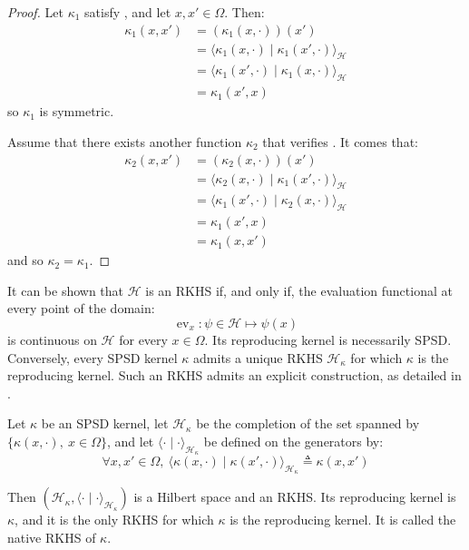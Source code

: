 \begin{proof}
	Let $\kappa_1$ satisfy , and let $x,x'\in\Omega$. Then:
	\begin{equation}
		\begin{aligned}
		\kappa_1(x,x')&=(\kappa_1(x,\cdot))(x')\\
		&=\langle \kappa_1(x,\cdot)\mid \kappa_1(x',\cdot)\rangle_{\mathcal{H}}\\
		&=\langle \kappa_1(x',\cdot)\mid \kappa_1(x,\cdot)\rangle_{\mathcal{H}}\\
		&=\kappa_1(x',x)
		\end{aligned}
	\end{equation}
	so $\kappa_1$ is symmetric.

	Assume that there exists another function $\kappa_2$ that verifies . It comes that:
	\begin{equation}
		\begin{aligned}
		\kappa_2(x,x')&=(\kappa_2(x,\cdot))(x')\\
		&=\langle \kappa_2(x,\cdot)\mid \kappa_1(x',\cdot)\rangle_{\mathcal{H}}\\
		&=\langle \kappa_1(x',\cdot)\mid \kappa_2(x,\cdot)\rangle_{\mathcal{H}}\\
		&=\kappa_1(x',x)\\
		&=\kappa_1(x,x')
		\end{aligned}
	\end{equation}
	and so $\kappa_2=\kappa_1$.
\end{proof}

It can be shown \cite{bib:RKHS-twelve-pages} that $\mathcal{H}$ is an RKHS if, and only if, the evaluation functional at every point of the domain:
\begin{equation}
	\operatorname{ev}_x:\psi\in\mathcal{H}\mapsto \psi(x)
\end{equation}
is continuous on $\mathcal{H}$ for every $x\in\Omega$. Its reproducing kernel is necessarily SPSD. Conversely, every SPSD kernel $\kappa$ admits a unique RKHS $\mathcal{H}_\kappa$ for which $\kappa$ is the reproducing kernel. Such an RKHS admits an explicit construction, as detailed in .

\begin{proposition}\label{th:native_RKHS}
	Let $\kappa$ be an SPSD kernel, let $\mathcal{H}_\kappa$ be the completion of the set spanned by $\{\kappa(x,\cdot),\:x\in\Omega\}$, and let $\langle\cdot\mid\cdot\rangle_{\mathcal{H}_\kappa}$ be defined on the generators by:
	\begin{equation}
		\forall x,x'\in\Omega,\:\langle \kappa(x,\cdot)\mid \kappa(x',\cdot)\rangle_{\mathcal{H}_\kappa}\triangleq \kappa(x,x')
	\end{equation}

	Then $(\mathcal{H}_\kappa,\langle\cdot\mid\cdot\rangle_{\mathcal{H}_\kappa})$ is a Hilbert space and an RKHS. Its reproducing kernel is $\kappa$, and it is the only RKHS for which $\kappa$ is the reproducing kernel. It is called the native RKHS of $\kappa$.
\end{proposition}


